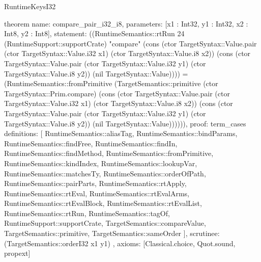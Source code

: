 \begin{lexlean}{RuntimeKeysI32}
\begin{semanticmodule}
theorem{
  name: compare_pair_i32_i8,
  parameters: [x1 : Int32, y1 : Int32, x2 : Int8, y2 : Int8],
  statement: ((RuntimeSemantics::rtRun 24 (RuntimeSupport::supportCrate) "compare" (cons (ctor TargetSyntax::Value.pair (ctor TargetSyntax::Value.i32 x1) (ctor TargetSyntax::Value.i8 x2)) (cons (ctor TargetSyntax::Value.pair (ctor TargetSyntax::Value.i32 y1) (ctor TargetSyntax::Value.i8 y2)) (nil TargetSyntax::Value)))) = (RuntimeSemantics::fromPrimitive (TargetSemantics::primitive (ctor TargetSyntax::Prim.compare) (cons (ctor TargetSyntax::Value.pair (ctor TargetSyntax::Value.i32 x1) (ctor TargetSyntax::Value.i8 x2)) (cons (ctor TargetSyntax::Value.pair (ctor TargetSyntax::Value.i32 y1) (ctor TargetSyntax::Value.i8 y2)) (nil TargetSyntax::Value)))))),
  proof: term_cases{
    definitions: [
      RuntimeSemantics::aliasTag,
      RuntimeSemantics::bindParams,
      RuntimeSemantics::findFree,
      RuntimeSemantics::findIn,
      RuntimeSemantics::findMethod,
      RuntimeSemantics::fromPrimitive,
      RuntimeSemantics::kindIndex,
      RuntimeSemantics::lookupVar,
      RuntimeSemantics::matchesTy,
      RuntimeSemantics::orderOfPath,
      RuntimeSemantics::pairParts,
      RuntimeSemantics::rtApply,
      RuntimeSemantics::rtEval,
      RuntimeSemantics::rtEvalArms,
      RuntimeSemantics::rtEvalBlock,
      RuntimeSemantics::rtEvalList,
      RuntimeSemantics::rtRun,
      RuntimeSemantics::tagOf,
      RuntimeSupport::supportCrate,
      TargetSemantics::compareValue,
      TargetSemantics::primitive,
      TargetSemantics::sameOrder
    ],
    scrutinee: (TargetSemantics::orderI32 x1 y1)
  },
  axioms: [Classical.choice, Quot.sound, propext]
}


\end{semanticmodule}
\end{lexlean}
